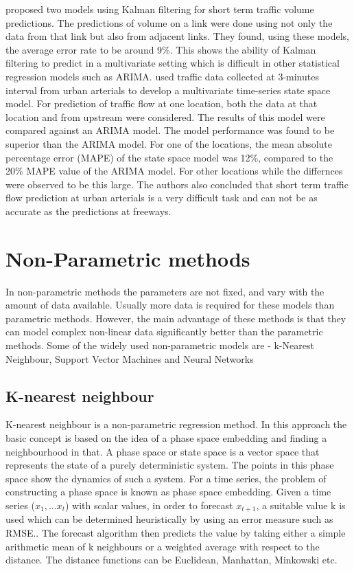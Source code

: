\citet{okutani1984dynamic} proposed two models using Kalman filtering for short term traffic volume
predictions. The predictions of volume on a link were done using not only the data from that link but
also from adjacent links. They found, using these models, the average error rate to be around 9\%.
This shows the ability of Kalman filtering to predict in a multivariate setting which is difficult in
other statistical regression models such as ARIMA. \citet{stathopoulos2003multivariate} used traffic
data collected at 3-minutes interval from urban arterials to develop a multivariate time-series
state space model. For prediction of traffic flow at one location, both the data at that location
and from upstream were considered. The results of this model were compared against an ARIMA model.
The model performance was found to be superior than the ARIMA model. For one of the locations, the
mean absolute percentage error (MAPE) of the state space model was 12\%, compared to the 20\% MAPE value
of the ARIMA model. For other locations while the differnces were observed to be this large. The
authors also concluded that short term traffic flow prediction at urban arterials is a very difficult
task and can not be as accurate as the predictions at freeways.

\section{Non-Parametric methods}
In non-parametric methods the parameters are not fixed, and vary with the amount of data available.
Usually more data is required for these models than parametric methods. However, the main advantage
of these methods is that they can model complex non-linear data significantly better than the
parametric methods. Some of the widely used non-parametric models are - k-Nearest Neighbour,
Support Vector Machines and Neural Networks

\subsection{K-nearest neighbour}
K-nearest neighbour is a non-parametric regression method. In this approach the basic concept is based
on the idea of a phase space embedding and finding a neighbourhood in that. A phase space or state
space is a vector space that represents the state of a purely deterministic system. The points in this
phase space show the dynamics of such a system. For a time series, the problem of constructing a phase
space is known as phase space embedding. Given a time series ($x_{1},...x_{t}$) with scalar values,
in order to forecast $x_{t+1}$, a suitable value k is used which can be determined heuristically by
using an error measure such as RMSE.. The forecast algorithm then predicts the value by taking either
a simple arithmetic mean of k neighbours or a weighted average with respect to the distance. The
distance functions can be Euclidean, Manhattan, Minkowski etc.


